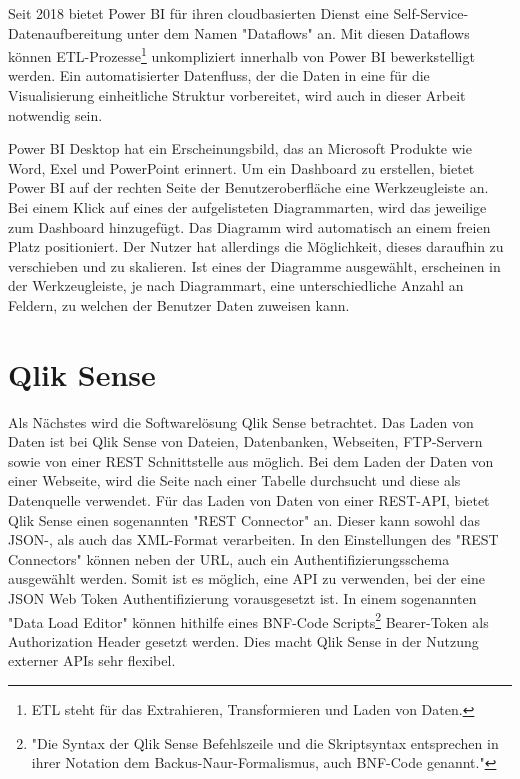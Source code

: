Seit 2018 bietet Power BI für ihren cloudbasierten Dienst eine Self-Service-Datenaufbereitung unter dem Namen "Dataflows" an.\cite{MicrosoftDataflowsPreview}
Mit diesen Dataflows können ETL-Prozesse\footnote{ETL steht für das Extrahieren, Transformieren und Laden von Daten.}
unkompliziert innerhalb von Power BI bewerkstelligt werden. Ein automatisierter Datenfluss,
der die Daten in eine für die Visualisierung einheitliche Struktur vorbereitet, wird auch in dieser
Arbeit notwendig sein.

Power BI Desktop hat ein Erscheinungsbild, das an Microsoft Produkte wie Word, Exel und
PowerPoint erinnert. Um ein Dashboard zu erstellen, bietet Power BI auf der rechten Seite
der Benutzeroberfläche eine Werkzeugleiste an. Bei einem Klick auf eines der aufgelisteten
Diagrammarten, wird das jeweilige zum Dashboard hinzugefügt. Das Diagramm wird 
automatisch an einem freien Platz positioniert. Der Nutzer hat allerdings die Möglichkeit,
dieses daraufhin zu verschieben und zu skalieren. Ist eines der Diagramme ausgewählt,
erscheinen in der Werkzeugleiste, je nach Diagrammart, eine unterschiedliche Anzahl an Feldern,
zu welchen der Benutzer Daten zuweisen kann.

\section{Qlik Sense}
\label{sec:qliksense}
Als Nächstes wird die Softwarelösung Qlik Sense betrachtet.
Das Laden von Daten ist bei Qlik Sense von Dateien, Datenbanken, Webseiten, FTP-Servern sowie von einer
REST Schnittstelle aus möglich. Bei dem Laden der Daten von einer Webseite, wird die Seite nach einer Tabelle
durchsucht und diese als Datenquelle verwendet.\cite[S. 17]{QlikSenseCookbook} Für das Laden von Daten von
einer REST-API, bietet Qlik Sense einen sogenannten "REST Connector" an. Dieser kann sowohl das \mbox{JSON-,} als auch
das XML-Format verarbeiten. In den Einstellungen des "REST Connectors" können neben der URL, auch ein
Authentifizierungsschema ausgewählt werden.\cite[S. 23]{QlikSenseCookbook} Somit ist es möglich,
eine API zu verwenden, bei der eine JSON Web Token Authentifizierung vorausgesetzt ist. In einem sogenannten
"Data Load Editor" können hithilfe eines BNF-Code Scripts\footnote{"Die Syntax der Qlik Sense Befehlszeile
und die Skriptsyntax entsprechen in ihrer Notation dem Backus-Naur-Formalismus, auch BNF-Code genannt."\cite{QlikSenseScriptLanguage}}
Bearer-Token als Authorization Header gesetzt werden. Dies macht Qlik Sense in der Nutzung externer
APIs sehr flexibel.

